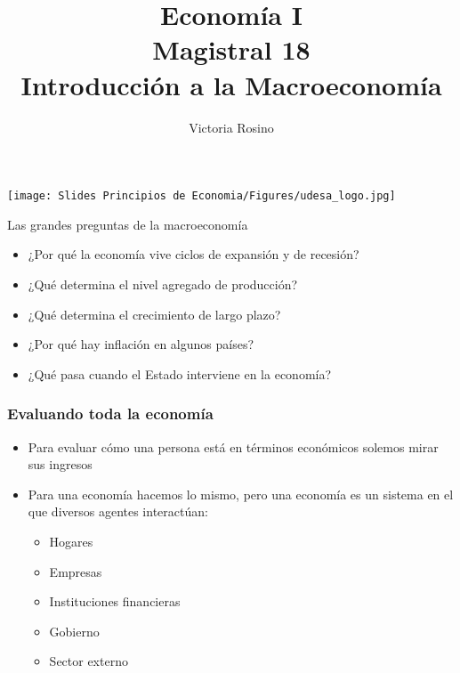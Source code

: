 \documentclass{beamer}
\title[Economía I]{Economía I \vspace{3mm}
\\ Magistral 18 \vspace{3mm} \\ Introducción a la Macroeconomía}
\date{}
\author[Victoria Rosino]{Victoria Rosino}
\institute[]{Universidad de San Andrés}
\begin{document}
\begin{frame}
\vspace{0.3cm}
\titlepage
\centering
\vspace{-0.9cm}
\texttt{[image: Slides Principios de Economia/Figures/udesa\_logo.jpg]} 
\end{frame}

\begin{frame}{Las grandes preguntas de la macroeconomía}
    \begin{itemize}
        \item ¿Por qué la economía vive ciclos de expansión y de recesión?
        \item ¿Qué determina el nivel agregado de producción?
        \item ¿Qué determina el crecimiento de largo plazo?
        \item ¿Por qué hay inflación en algunos países?
        \item ¿Qué pasa cuando el Estado interviene en la economía?
    \end{itemize} 
    
\end{frame}


\begin{frame}
\frametitle{Evaluando toda la economía}
\begin{itemize}
        \item Para evaluar cómo una persona está en términos económicos solemos mirar sus ingresos \vspace{1mm}
        \item Para una economía hacemos lo mismo, pero una economía es un sistema en el que diversos agentes interactúan: \vspace{1mm}
        \begin{itemize}
            \item Hogares
            \item Empresas
            \item Instituciones financieras
            \item Gobierno
            \item Sector externo
        \end{itemize}
\end{itemize}
\end{frame}
\end{document}
